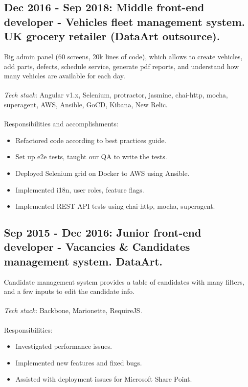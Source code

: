 \documentclass[a4paper, 14pt]{article}
\begin{document}
  \subsection{Dec 2016 - Sep 2018: Middle front-end developer - Vehicles fleet management system. UK grocery retailer (DataArt outsource).
}
  Big admin panel (60 screens, 20k lines of code), which allows to create vehicles, add parts, defects, schedule service, generate pdf reports, and understand how many vehicles are available for each day. \\
  \\
  \textit{Tech stack:} Angular v1.x, Selenium, protractor, jasmine, chai-http, mocha, superagent, AWS, Ansible, GoCD, Kibana, New Relic.
  \\
  \\
  Responsibilities and accomplishments:
    \begin{itemize}
      \item Refactored code according to best practices guide. \\
      \item Set up e2e tests, taught our QA to write the tests. \\
      \item Deployed Selenium grid on Docker to AWS using Ansible. \\
      \item Implemented i18n, user roles, feature flags. \\
      \item Implemented REST API tests using chai-http, mocha, superagent. \\
    \end{itemize}
    \bigskip

  \subsection{Sep 2015 - Dec 2016: Junior front-end developer - Vacancies \& Candidates management system. DataArt.}
  Candidate management system provides a table of candidates with many filters, and a few inputs to edit the candidate info. \\
  \\
    \textit{Tech stack:} Backbone, Marionette, RequireJS. \\
  \\
  Responsibilities:
    \begin{itemize}
      \item Investigated performance issues. \\
      \item Implemented new features and fixed bugs. \\
      \item Assisted with deployment issues for Microsoft Share Point.
    \end{itemize}
\end{document}
